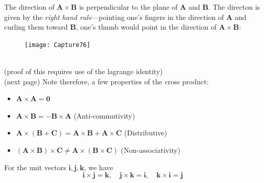 \documentclass{report}
\begin{document}
The direction of $\mathbf{A\times B}$ is perpendicular to the plane of $\mathbf{A}$ and $\mathbf{B}$. 
The directon is given by the \textit{right hand rule}---pointing one's fingers in the direction of 
$\mathbf{A}$ and curling them toward $\mathbf{B}$, one's thumb would point in the direction of 
$\mathbf{A\times B}$:
\begin{figure}[h]
\texttt{[image: Capture76]}\\
\centering
\end{figure}\\
(proof of this requires use of the lagrange identity)\\
(next page)
\newpage
\noindent Note therefore, a few properties of the cross product:
\begin{itemize}
\item $\mathbf{A\times A=0}$
\item $\mathbf{A\times B=-B\times A}$ (Anti-commutivity)
\item $\mathbf{A\times(B+C)=A\times B+A\times C}$
(Distributive)
\item $\mathbf{(A\times B)\times C\neq A\times(B\times C)}$ (Non-associativity)
\end{itemize}
For the unit vectors $\mathbf{i,j,k}$, we have
\begin{equation*}
\mathbf{i\times j=k,\quad j\times k=i,\quad k\times i=j}
\end{equation*}
\newpage
\end{document}
